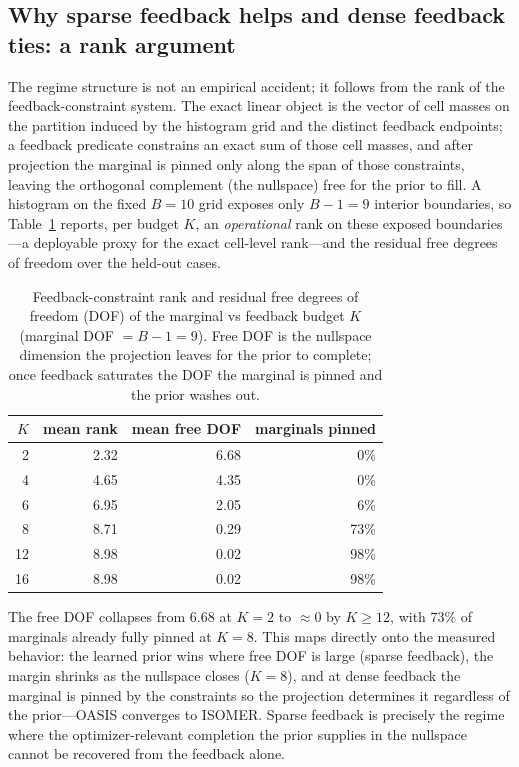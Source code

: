 \subsection{Why sparse feedback helps and dense feedback ties: a rank argument}
\label{sec:mr-mechanism}

The regime structure is not an empirical accident; it follows from the rank of
the feedback-constraint system. The exact linear object is the vector of cell masses on
the partition induced by the histogram grid and the distinct feedback endpoints; a
feedback predicate constrains an exact sum of those cell masses, and after projection the
marginal is pinned only along the span of those constraints, leaving the orthogonal
complement (the nullspace) free for the prior to fill. A histogram on the fixed
$B{=}10$ grid exposes only $B{-}1{=}9$ interior boundaries, so Table~\ref{tab:mr_rank}
reports, per budget $K$, an \emph{operational} rank on these exposed boundaries---a
deployable proxy for the exact cell-level rank---and the residual free degrees of freedom
over the held-out cases.

\begin{table}[t]
  \centering\small
  \caption{Feedback-constraint rank and residual free degrees of freedom (DOF) of
  the marginal vs feedback budget $K$ (marginal DOF $=B{-}1=9$). Free DOF is the
  nullspace dimension the projection leaves for the prior to complete; once
  feedback saturates the DOF the marginal is pinned and the prior washes out.}
  \label{tab:mr_rank}
  \setlength{\tabcolsep}{8pt}
  \begin{tabular}{r rr r}
    \toprule
    $K$ & mean rank & mean free DOF & marginals pinned \\
    \midrule
    2  & 2.32 & 6.68 & 0\% \\
    4  & 4.65 & 4.35 & 0\% \\
    6  & 6.95 & 2.05 & 6\% \\
    8  & 8.71 & 0.29 & 73\% \\
    12 & 8.98 & 0.02 & 98\% \\
    16 & 8.98 & 0.02 & 98\% \\
    \bottomrule
  \end{tabular}
\end{table}

The free DOF collapses from $6.68$ at $K{=}2$ to $\approx 0$ by $K{\geq}12$, with
$73\%$ of marginals already fully pinned at $K{=}8$. This maps directly onto the
measured behavior: the learned prior wins where free DOF is large (sparse
feedback), the margin shrinks as the nullspace closes ($K{=}8$), and at dense
feedback the marginal is pinned by the constraints so the projection determines
it regardless of the prior---OASIS converges to ISOMER. Sparse feedback is
precisely the regime where the optimizer-relevant completion the prior supplies
in the nullspace cannot be recovered from the feedback alone.


